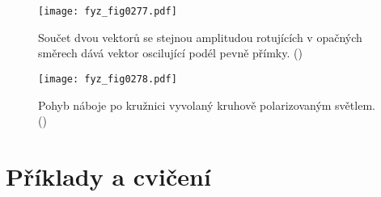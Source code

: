     
    \begin{figure}[ht!] %
      \centering
      \texttt{[image: fyz\_fig0277.pdf]}
      \caption{Součet dvou vektorů se stejnou amplitudou rotujících v opačných směrech dává vektor
               oscilující podél pevně přímky. (\cite[s.~427]{Feynman01})}
      \label{fyz:fig0277}
    \end{figure}
    
    \begin{figure}[ht!] %
      \centering
      \texttt{[image: fyz\_fig0278.pdf]}
      \caption{Pohyb náboje po kružnici vyvolaný kruhově polarizovaným světlem.
               (\cite[s.~427]{Feynman01})}
      \label{fyz:fig0278}
    \end{figure}

  \section{Příklady a cvičení}\label{fyz:IchapXXXIIIsecIX}


